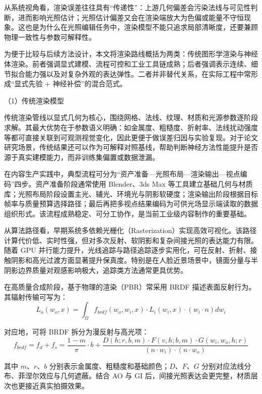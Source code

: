 从系统视角看，渲染误差往往具有“传递性”：上游几何偏差会污染法线与可见性判断，进而影响光照估计；光照估计偏差又会在渲染端放大为色偏或能量不守恒现象。这也是为什么在光照编辑任务中，渲染模型不能只追求局部清晰度，还要兼顾物理一致性与参数可解释性。

为便于比较与后续方法设计，本文将渲染路线概括为两类：传统图形学渲染与神经体渲染。前者强调显式建模、流程可控和工业工具链成熟；后者强调表示连续、细节拟合能力强以及对复杂外观的表达弹性。二者并非替代关系，在实际工程中常形成“显式先验 + 神经补偿”的混合范式。

（1）传统渲染模型

传统渲染管线以显式几何为核心，围绕网格、法线、纹理、材质和光源参数逐阶段求解。其最大优势在于参数语义明确：如金属度、粗糙度、折射率、法线扰动强度等都可直接关联到可观测视觉变化，因此更便于做误差归因与实验复现。对于论文研究场景，传统结果还可以作为可解释对照基线，帮助判断神经方法性能提升是否源于真实建模能力，而非训练集偏置或数据泄漏。

在内容生产实践中，典型流程可分为“资产准备—光照布局—渲染输出—视点编码”四步。资产准备阶段通常使用 Blender、3ds Max 等工具建立基础几何与材质库\cite{BlenderFoundation2019}；光照布局阶段设置主光、辅光、环境光与阴影软硬度；渲染输出阶段根据目标帧率与质量预算选择路径；最后再把多视点结果编码为可供光场显示端读取的数据组织形式。该流程成熟稳定、可分工协作，是当前工业级内容制作的重要基础。

从算法路径看，早期系统多依赖光栅化（Rasterization）实现高效可视化。该路径计算代价低、实时性强，但对多次反射、软阴影和复杂间接光照的表达能力有限。随着 GPU 并行能力提升，光线追踪与路径追踪逐步实用化，可在反射、折射、接触阴影和高光过渡方面显著提升保真度\cite{Pharr2016}。特别是在人脸近景场景中，镜面分量与半阴影边界质量对观感影响极大，追踪类方法通常更具优势。

在高质量合成阶段，基于物理的渲染（PBR）常采用 BRDF 描述表面反射行为\cite{Walter2007}。其辐射传输可写为：
\begin{equation}
L_o(w_o, x) = \int_{\Omega} f_{brdf}(w_o, w_i, x) \cdot L_i(w_i, x) \cdot (w_i \cdot n) dw_i
\end{equation}

对应地，可将 BRDF 拆分为漫反射与高光项：
\begin{equation}
f_{brdf} = f_d + f_s = \frac{1 - m}{\pi} \cdot b + \frac{D(h; r, b, m) \cdot F(v, h; b, m) \cdot G(w_i, w_o, h; r)}{(n \cdot w_i) \cdot (n \cdot w_o)}
\end{equation}

其中 $m$、$r$、$b$ 分别表示金属度、粗糙度和基础颜色；$D$、$F$、$G$ 分别对应法线分布、菲涅尔效应与几何遮蔽。结合 AO 与 GI 后，间接光照表达会更完整，材质层次也更接近真实拍摄效果。

